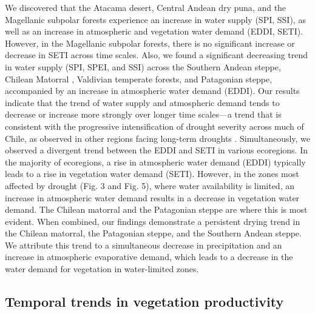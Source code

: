 \documentclass[
  sn-nature,
  numbered]{sn-jnl}
\begin{document}
We discovered that the Atacama desert, Central Andean dry puna, and the
Magellanic subpolar forests experience an increase in water supply (SPI,
SSI), as well as an increase in atmospheric and vegetation water demand
(EDDI, SETI). However, in the Magellanic subpolar forests, there is no
significant increase or decrease in SETI across time scales. Also, we
found a significant decreasing trend in water supply (SPI, SPEI, and
SSI) across the Southern Andean steppe, Chilean Matorral
\citep{Boisier2018, Sarricolea2019}, Valdivian temperate forests, and
Patagonian steppe, accompanied by an increase in atmospheric water
demand (EDDI). Our results indicate that the trend of water supply and
atmospheric demand tends to decrease or increase more strongly over
longer time scales---a trend that is consistent with the progressive
intensification of drought severity across much of Chile, as observed in
other regions facing long-term droughts \citep{Rashid2019, Miro2023}.
Simultaneously, we observed a divergent trend between the EDDI and SETI
in various ecoregions. In the majority of ecoregions, a rise in
atmospheric water demand (EDDI) typically leads to a rise in vegetation
water demand (SETI). However, in the zones most affected by drought
(Fig. 3 and Fig. 5), where water availability is limited, an increase in
atmospheric water demand results in a decrease in vegetation water
demand. The Chilean matorral and the Patagonian steppe are where this is
most evident. When combined, our findings demonstrate a persistent
drying trend in the Chilean matorral, the Patagonian steppe, and the
Southern Andean steppe. We attribute this trend to a simultaneous
decrease in precipitation and an increase in atmospheric evaporative
demand, which leads to a decrease in the water demand for vegetation in
water-limited zones\citep{Pascoa2021}.

\subsection{Temporal trends in vegetation
productivity}\label{temporal-trends-in-vegetation-productivity}
\end{document}
